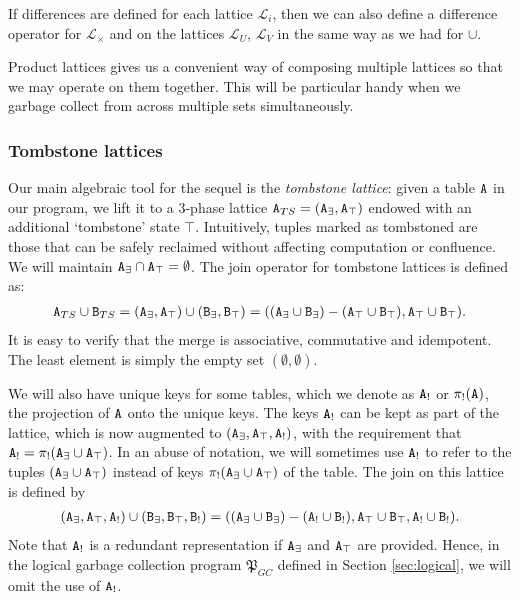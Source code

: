 \documentclass{article}
\numberwithin{equation}{section}
\renewcommand{\tt}[1]{\ifmmode\text{\texttt{#1}}\else\texttt{#1}\fi}
\begin{document}
If differences are defined for each lattice $\mathcal{L}_i$, then we can also define a difference operator for $\mathcal{L}_\times$ and on the lattices $\mathcal{L}_U$, $\mathcal{L}_V$ in the same way as we had for $\cup$.

Product lattices gives us a convenient way of composing multiple lattices so that we may operate on them together.
This will be particular handy when we garbage collect from across multiple sets simultaneously.


\subsubsection{Tombstone lattices}
Our main algebraic tool for the sequel is the \emph{tombstone lattice}:
given a table $\tt{A}$ in our program, we lift it to a 3-phase lattice $\tt{A}_{TS} = (\tt{A}_\exists, \tt{A}_\top)$ endowed with an additional `tombstone' state $\top$.
Intuitively, tuples marked as tombstoned are those that can be safely reclaimed without affecting computation or confluence.
We will maintain $\tt{A}_\exists \cap \tt{A}_\top = \emptyset$.
The join operator for tombstone lattices is defined as:
\begin{align*}
\tt{A}_{TS} \cup \tt{B}_{TS} = (\tt{A}_\exists, \tt{A}_\top) \cup (\tt{B}_\exists, \tt{B}_\top) = ((\tt{A}_\exists \cup \tt{B}_\exists) - (\tt{A}_\top \cup \tt{B}_\top), \tt{A}_\top \cup \tt{B}_\top).
\end{align*}
It is easy to verify that the merge is associative, commutative and idempotent.
The least element is simply the empty set $(\emptyset, \emptyset)$.

We will also have unique keys for some tables, which we denote as $\tt{A}_!$ or $\pi_!(\tt{A})$, the projection of $\tt{A}$ onto the unique keys.
The keys $\tt{A}_!$ can be kept as part of the lattice, which is now augmented to $(\tt{A}_\exists, \tt{A}_\top, \tt{A}_!)$, with the requirement that $\tt{A}_! = \pi_!(\tt{A}_\exists \cup \tt{A}_\top)$.
In an abuse of notation, we will sometimes use $\tt{A}_!$ to refer to the tuples $(\tt{A}_\exists \cup \tt{A}_\top)$ instead of keys $\pi_!(\tt{A}_\exists \cup \tt{A}_\top)$ of the table.
The join on this lattice is defined by
\begin{align*}
(\tt{A}_\exists, \tt{A}_\top, \tt{A}_!) \cup (\tt{B}_\exists, \tt{B}_\top, \tt{B}_!) = ((\tt{A}_\exists \cup \tt{B}_\exists) - (\tt{A}_! \cup \tt{B}_!), \tt{A}_\top \cup \tt{B}_\top, \tt{A}_! \cup \tt{B}_!).
\end{align*}
Note that $\tt{A}_!$ is a redundant representation if $\tt{A}_\exists$ and $\tt{A}_\top$ are provided.
Hence, in the logical garbage collection program $\mathfrak{P}_{GC}$ defined in Section \ref{sec:logical}, we will omit the use of $\tt{A}_!$.
\end{document}
